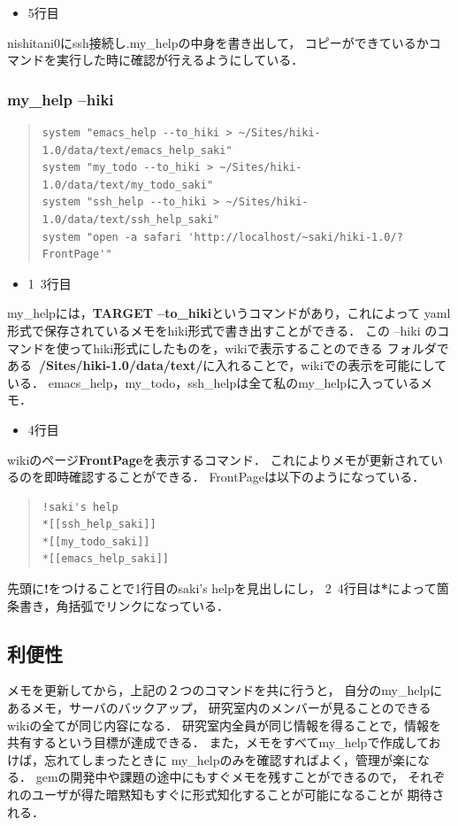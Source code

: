 \begin{itemize}
\item 5行目
\end{itemize}
nishitani0にssh接続し.my\_helpの中身を書き出して，
コピーができているかコマンドを実行した時に確認が行えるようにしている．

\subsubsection{my\_help --hiki}\begin{quote}\begin{verbatim}
system "emacs_help --to_hiki > ~/Sites/hiki-1.0/data/text/emacs_help_saki"
system "my_todo --to_hiki > ~/Sites/hiki-1.0/data/text/my_todo_saki"
system "ssh_help --to_hiki > ~/Sites/hiki-1.0/data/text/ssh_help_saki"
system "open -a safari 'http://localhost/~saki/hiki-1.0/?FrontPage'"
\end{verbatim}\end{quote}
\begin{itemize}
\item 1~3行目
\end{itemize}
my\_helpには，\textbf{TARGET --to\_hiki}というコマンドがあり，これによって
yaml形式で保存されているメモをhiki形式で書き出すことができる．
この --hiki のコマンドを使ってhiki形式にしたものを，wikiで表示することのできる
フォルダである\textbf{~/Sites/hiki-1.0/data/text/}に入れることで，wikiでの表示を可能にしている．
emacs\_help，my\_todo，ssh\_helpは全て私のmy\_helpに入っているメモ．

\begin{itemize}
\item 4行目
\end{itemize}
wikiのページ\textbf{FrontPage}を表示するコマンド．
これによりメモが更新されているのを即時確認することができる．
FrontPageは以下のようになっている．
\begin{quote}\begin{verbatim}
!saki's help
*[[ssh_help_saki]]
*[[my_todo_saki]]
*[[emacs_help_saki]]
\end{verbatim}\end{quote}
先頭に\textbf{!}をつけることで1行目のsaki's helpを見出しにし，
2~4行目は\textbf{*}によって箇条書き，角括弧でリンクになっている．

\subsection{利便性}
メモを更新してから，上記の２つのコマンドを共に行うと，
自分のmy\_helpにあるメモ，サーバのバックアップ，
研究室内のメンバーが見ることのできるwikiの全てが同じ内容になる．
研究室内全員が同じ情報を得ることで，情報を共有するという目標が達成できる．
また，メモをすべてmy\_helpで作成しておけば，忘れてしまったときに
my\_helpのみを確認すればよく，管理が楽になる．
gemの開発中や課題の途中にもすぐメモを残すことができるので，
それぞれのユーザが得た暗黙知もすぐに形式知化することが可能になることが
期待される．

